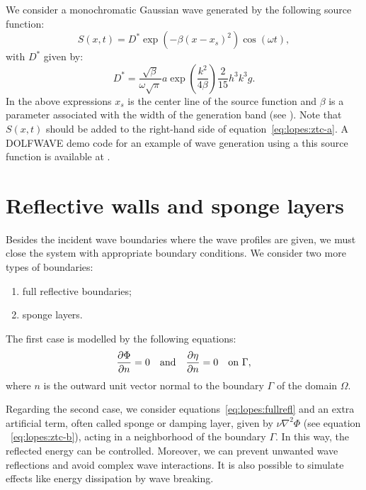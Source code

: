 We consider a monochromatic Gaussian wave generated by the following
source function:
\begin{equation}
  \label{eq:lopes:src}
  S(x,t)=D^* \exp(-\beta (x-x_s)^2)\cos(\omega t),
\end{equation}
with $D^*$ given by:
\begin{equation}
D^* = \frac{\sqrt{\beta}} {\omega\sqrt{\pi}} a
\exp(\frac{k^2}{4\beta})\frac{2}{15}h^3k^3g.
\end{equation}
In the above expressions $x_s$ is the center line of the source function
and $\beta$ is a parameter associated with the width of the generation
band (see \citet{WeiKirbySinha1999}).  Note that $S(x,t)$ should be added
to the right-hand side of equation~\eqref{eq:lopes:ztc-a}.  A DOLFWAVE
demo code for an example of wave generation using a this source function
is available at .

\section{Reflective walls and sponge layers}
\label{sec:lopes:boundaryconditions}

Besides the incident wave boundaries where the wave profiles are
given, we must close the system with appropriate boundary conditions.
We consider two more types of boundaries:
\begin{enumerate}
\item full reflective boundaries;
\item sponge layers.
\end{enumerate}
The first case is modelled by the following equations:
\begin{equation}\label{eq:lopes:fullrefl}
  \frac{\partial \Phi}{\partial n}=0\quad {\rm
    and}\quad\frac{\partial \eta}{\partial n}=0\quad {\rm
    on\,\, } \Gamma,
\end{equation}
where $n$ is the outward unit vector normal to the boundary
$\Gamma$ of the domain $\Omega$.

Regarding the second case, we consider equations~\eqref{eq:lopes:fullrefl}
and an extra artificial term, often called sponge 
or damping layer, given by $\nu\nabla^2\Phi$ (see equation
~\eqref{eq:lopes:ztc-b}), acting in a neighborhood of the boundary
$\Gamma$.  In this way, the reflected energy can be controlled. Moreover,
we can prevent unwanted wave reflections and avoid complex wave
interactions.  It is also possible to simulate effects like energy
dissipation by wave breaking.

